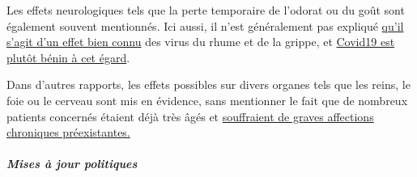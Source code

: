 Les effets neurologiques tels que la perte temporaire de l'odorat ou du
goût sont également souvent mentionnés. Ici aussi, il n'est généralement
pas expliqué \href{https://www.ncbi.nlm.nih.gov/pubmed/25294743}{qu'il
s'agit d'un effet bien connu} des virus du rhume et de la grippe, et
\href{https://www.ncbi.nlm.nih.gov/pubmed/23948436}{Covid19 est plutôt
bénin à cet égard}.

Dans d'autres rapports, les effets possibles sur divers organes tels que
les reins, le foie ou le cerveau sont mis en évidence, sans mentionner
le fait que de nombreux patients concernés étaient déjà très âgés et
\href{https://www.epicentro.iss.it/coronavirus/sars-cov-2-decessi-italia}{souffraient
de graves affections chroniques préexistantes.}

\hypertarget{mises-uxe0-jour-politiques}{%
\subparagraph{\texorpdfstring{\textbf{Mises à jour
politiques}}{Mises à jour politiques}}\label{mises-uxe0-jour-politiques}}

